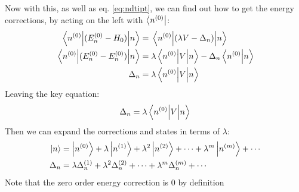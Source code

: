 \documentclass[12pt]{article}
\begin{document}
Now with this, as well as eq. \eqref{eq:ndtipt}, we can find out how to get the energy corrections, by acting on the left with $\bra{n^{(0)}}$:
\begin{align*}
  \mel{n^{(0)}}{(E_n^{(0)}-H_0)}{n}&=\mel{n^{(0)}}{(\lambda V-\Delta_n)}{n}\\
  \mel{n^{(0)}}{(E_n^{(0)}-E_n^{(0)})}{n}&=
  \lambda\mel{n^{(0)}}{V}{n}-\Delta_n\ip{n^{(0)}}{n}\\
  \Delta_n&=\lambda\mel{n^{(0)}}{V}{n}
\end{align*}
Leaving the key equation:
\begin{equation}
  \label{eq:thekey}
  \Delta_n=\lambda\mel{n^{(0)}}{V}{n}
\end{equation}
Then we can expand the corrections and states in terms of $\lambda$:
\begin{equation}
  \label{eq:expansions}
  \begin{aligned}
    \ket{n}&=\ket{n^{(0)}}+\lambda\ket{n^{(1)}}+\lambda^2\ket{n^{(2)}}
    +\cdots+\lambda^m\ket{n^{(m)}}+\cdots\\
    \Delta_n&=\lambda\Delta_n^{(1)}+\lambda^2\Delta_n^{(2)}
    +\cdots+\lambda^m\Delta_n^{(m)}+\cdots
  \end{aligned}
\end{equation}
Note that the zero order energy correction is $0$ by definition
\end{document}
